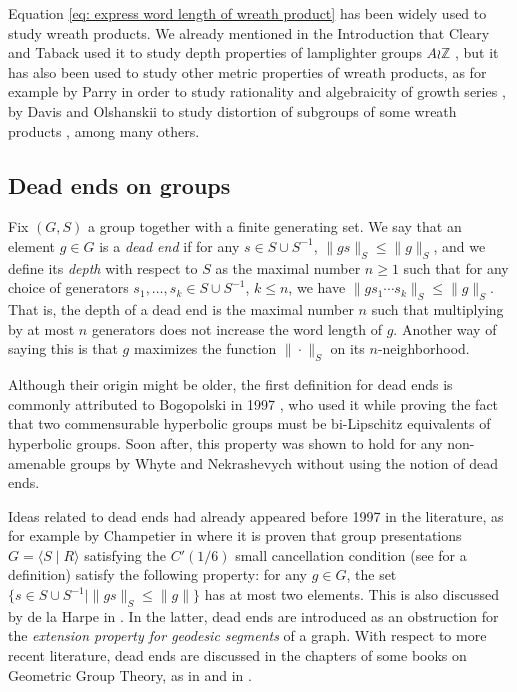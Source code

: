 \documentclass[reqno,oneside]{amsart}
\newcommand{\Z}{\mathbb{Z}}
\theoremstyle{plain}
\theoremstyle{definition}
\begin{document}
Equation \eqref{eq: express word length of wreath product} has been widely used to study wreath products. We already mentioned in the Introduction that Cleary and Taback used it to study depth properties of lamplighter groups $A\wr \Z$ \cite{ClearyTaback05}, but it has also been used to study other metric properties of wreath products, as for example by Parry in order to study rationality and algebraicity of growth series \cite{Parry1992}, by Davis and Olshanskii to study distortion of subgroups of some wreath products \cite{DavisOlshanskii2011}, among many others.



\subsection{Dead ends on groups}\label{subsection: dead ends on groups}
Fix $(G,S)$ a group together with a finite generating set. We say that an element $g\in G$ is a \textit{dead end} if for any $s\in S\cup S^{-1}$, $\|gs\|_S\le \|g\|_S$, and we define its \textit{depth} with respect to $S$ as the maximal number $n\ge 1$ such that for any choice of generators $s_1,\ldots,s_k\in S\cup S^{-1}$, $k\le n$, we have $\|gs_1\cdots s_k\|_S\le\|g\|_S$. That is, the depth of a dead end is the maximal number $n$ such that multiplying by at most $n$ generators does not increase the word length of $g$. Another way of saying this is that $g$ maximizes the function $\|\cdot\|_S$ on its $n$-neighborhood.


Although their origin might be older, the first definition for dead ends is commonly attributed to Bogopolski in 1997 \cite{Bogopolski97}, who used it while proving  the fact that two commensurable hyperbolic groups must be bi-Lipschitz equivalents of hyperbolic groups. Soon after, this property was shown to hold for any non-amenable groups by Whyte \cite{Whyte99} and Nekrashevych \cite{Nekrashevych98} without using the notion of dead ends. 

Ideas related to dead ends had already appeared before 1997 in the literature, as for example by Champetier in \cite[Lemme 4.19]{Champetier95} where it is proven that group presentations $G=\langle S\mid R\rangle$ satisfying the $C'(1/6)$ small cancellation condition (see \cite[Chapter V.2]{LyndonSchupp2001} for a definition) satisfy the following property: for any $g\in G$, the set $\{ s\in S\cup S^{-1}\mid \|gs\|_S\le \|g\|  \}$ has at most two elements. This is also discussed by de la Harpe in \cite[Chapter IV.A. 13,14]{delaHarpe2000}. In the latter, dead ends are introduced as an obstruction for the \textit{extension property for geodesic segments} of a graph. With respect to more recent literature, dead ends are discussed in the chapters of some books on Geometric Group Theory, as in \cite[Subsections 1.8.5, 2.6.4 \& 4.7.2]{sampling2018} and in \cite[Chapters 12, 15 \& 16]{officehours17}.
\end{document}
